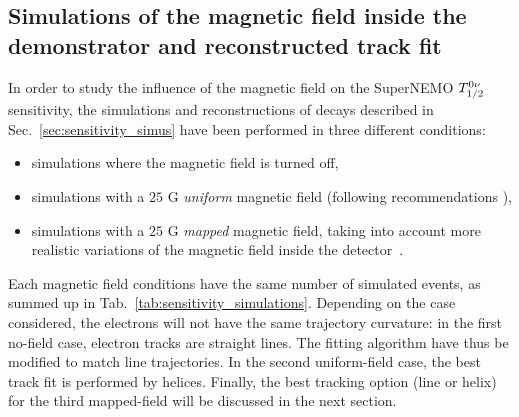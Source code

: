 \subsection{Simulations of the magnetic field inside the demonstrator and reconstructed track fit}
In order to study the influence of the magnetic field on the SuperNEMO $T_{1/2}^{0\nu}$ sensitivity, the simulations and reconstructions of decays described in Sec.~\ref{sec:sensitivity_simus} have been performed in three different conditions:
\begin{itemize}
\item simulations where the magnetic field is turned off,
\item simulations with a $25$ G \emph{uniform} magnetic field (following recommendations \cite{CalvezThesis}),
\item simulations with a $25$ G \emph{mapped} magnetic field, taking into account more realistic variations of the magnetic field inside the detector~\cite{docdb:map_magnetic_field2015}.
\end{itemize}
Each magnetic field conditions have the same number of simulated events, as summed up in Tab.~\ref{tab:sensitivity_simulations}.
Depending on the case considered, the electrons will not have the same trajectory curvature: in the first no-field case, electron tracks are straight lines.
The fitting algorithm have thus be modified to match line trajectories.
In the second uniform-field case, the best track fit is performed by helices.
Finally, the best tracking option (line or helix) for the third mapped-field will be discussed in the next section.



